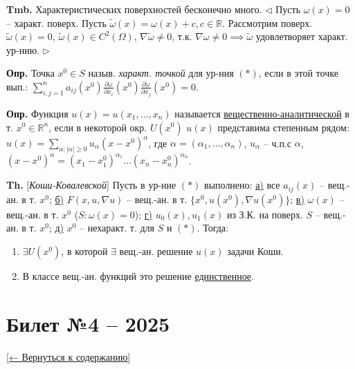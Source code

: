 \documentclass[12pt, a4paper]{article}
\newcommand{\backtotoc}{\small\hyperref[toc]{[← Вернуться к содержанию]}}
\begin{document}
\textbf{Tmb.} Характеристических поверхностей бесконечно много.
$\triangleleft$ Пусть $\omega(x)=0$ -- характ. поверх. Пусть $\tilde{\omega}(x) = \omega(x)+c, c \in \mathbb{R}$. Рассмотрим поверх. $\tilde{\omega}(x)=0$, $\tilde{\omega}(x) \in C^2(\Omega)$, $\nabla \tilde{\omega} \ne 0$, т.к. $\nabla \omega \ne 0 \implies \tilde{\omega}$ удовлетворяет характ. ур-нию. $\triangleright$

\textbf{Опр.} Точка $x^0 \in S$ назыв. \textit{характ. точкой} для ур-ния $(*)$, если в этой точке вып.:
$\sum_{i,j=1}^n a_{ij}(x^0) \frac{\partial \omega}{\partial x_i}(x^0) \frac{\partial \omega}{\partial x_j}(x^0) = 0$.

\textbf{Опр.} Функция $u(x)=u(x_1, \dots, x_n)$ называется \underline{вещественно-аналитической} в т. $x^0 \in \mathbb{R}^n$, если в некоторой окр. $U(x^0)$ $u(x)$ представима степенным рядом:
$u(x) = \sum_{\alpha: |\alpha| \ge 0} u_\alpha (x-x^0)^\alpha$, где $\alpha=(\alpha_1, \dots, \alpha_n)$, $u_\alpha$ -- ч.п.с $\alpha$, $(x-x^0)^\alpha = (x_1-x_1^0)^{\alpha_1} \dots (x_n-x_n^0)^{\alpha_n}$.

\textbf{Th.} [\textit{Коши-Ковалевской}]
Пусть в ур-ние $(*)$ выполнено:
\underline{а)} все $a_{ij}(x)$ -- вещ.-ан. в т. $x^0$;
\underline{б)} $F(x,u,\nabla u)$ -- вещ.-ан. в т. $\{x^0, u(x^0), \nabla u(x^0)\}$;
\underline{в)} $\omega(x)$ -- вещ.-ан. в т. $x^0$ ($S: \omega(x)=0$);
\underline{г)} $u_0(x), u_1(x)$ из З.К. на поверх. $S$ -- вещ.-ан. в т. $x^0$;
\underline{д)} $x^0$ -- нехаракт. т. для $S$ и $(*)$.
Тогда:
\begin{enumerate}
    \item $\exists U(x^0)$, в которой $\exists$ вещ.-ан. решение $u(x)$ задачи Коши.
    \item В классе вещ.-ан. функций это решение \underline{единственное}.
\end{enumerate}

\hfill {}
\newpage

\section*{Билет №4 -- 2025}\label{sec:ticket4}
\backtotoc
\end{document}
